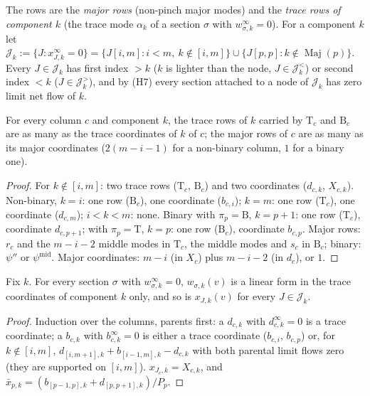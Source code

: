 \documentclass[11pt,a4paper]{report}
\newcommand{\cJ}{\mathcal J}
\newcommand{\Ts}{\mathrm T}
\newcommand{\Bs}{\mathrm B}
\newcommand{\Maj}{\operatorname{Maj}}
\begin{document}
The rows are the \emph{major rows} (non-pinch major modes) and the \emph{trace rows of component \(k\)} (the trace mode \(\alpha_k\) of a
section \(\sigma\) with \(w^\infty_{\sigma,k}=0\)). For a component \(k\) let
\(\cJ_k:=\{J:x^\infty_{J,k}=0\}=\{J[i,m]:i<m,\ k\notin[i,m]\}\cup\{J[p,p]:k\notin\Maj(p)\}\). Every \(J\in\cJ_k\) has first index \(>k\)
(\(k\) is lighter than the node, \(J\in\cJ^<_k\)) or second index \(<k\) (\(J\in\cJ^>_k\)), and by (H7) every section attached to a node of
\(\cJ_k\) has zero limit net flow of \(k\).

\begin{lemma}[counts]\label{lem:counts}
For every column \(c\) and component \(k\), the trace rows of \(k\) carried by \(\Ts_c\) and \(\Bs_c\) are as many as the trace coordinates of
\(k\) of \(c\); the major rows of \(c\) are as many as its major coordinates (\(2(m-i-1)\) for a non-binary column, \(1\) for a binary one).
\end{lemma}
\begin{proof}
For \(k\notin[i,m]\): two trace rows (\(\Ts_c\), \(\Bs_c\)) and two coordinates (\(d_{c,k}\), \(X_{c,k}\)). Non-binary, \(k=i\): one row (\(\Bs_c\)),
one coordinate (\(b_{c,i}\)); \(k=m\): one row (\(\Ts_c\)), one coordinate (\(d_{c,m}\)); \(i<k<m\): none. Binary with \(\pi_p=\Bs\), \(k=p+1\): one
row (\(\Ts_c\)), coordinate \(d_{c,p+1}\); with \(\pi_p=\Ts\), \(k=p\): one row (\(\Bs_c\)), coordinate \(b_{c,p}\). Major rows: \(r_c\) and the
\(m-i-2\) middle modes in \(\Ts_c\), the middle modes and \(s_c\) in \(\Bs_c\); binary: \(\psi''\) or \(\psi^{\mathrm{mid}}\). Major coordinates:
\(m-i\) (in \(X_c\)) plus \(m-i-2\) (in \(d_c\)), or \(1\).
\end{proof}

\begin{lemma}\label{lem:tracelinear}
Fix \(k\). For every section \(\sigma\) with \(w^\infty_{\sigma,k}=0\), \(w_{\sigma,k}(v)\) is a linear form in the trace coordinates of component
\(k\) only, and so is \(x_{J,k}(v)\) for every \(J\in\cJ_k\).
\end{lemma}
\begin{proof}
Induction over the columns, parents first: a \(d_{c,k}\) with \(d^\infty_{c,k}=0\) is a trace coordinate; a \(b_{c,k}\) with \(b^\infty_{c,k}=0\)
is either a trace coordinate (\(b_{c,i}\), \(b_{c,p}\)) or, for \(k\notin[i,m]\), \(d_{[i,m+1],k}+b_{[i-1,m],k}-d_{c,k}\) with both parental
limit flows zero (they are supported on \([i,m]\)). \(x_{J_c,k}=X_{c,k}\), and \(\bar x_{p,k}=(b_{[p-1,p],k}+d_{[p,p+1],k})/P_p\).
\end{proof}
\end{document}
